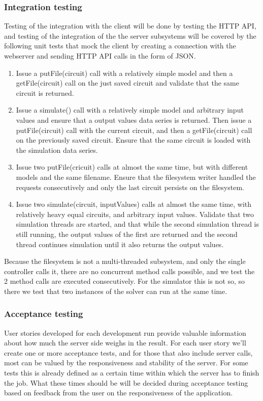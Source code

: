 \subsubsection{Integration testing}
Testing of the integration with the client will be done by testing the HTTP API, and testing of the integration of the the server subsystems will be covered by the following unit tests that mock the client by creating a connection with the webserver and sending HTTP API calls in the form of JSON.

\begin{enumerate}
\item Issue a putFile(circuit) call with a relatively simple model and then a getFile(circuit) call on the just saved circuit and validate that the same circuit is returned.
\item Issue a simulate() call with a relatively simple model and arbitrary input values and ensure that a output values data series is returned. Then issue a putFile(circuit) call with the current circuit, and then a getFile(circuit) call on the previously saved circuit. Ensure that the same circuit is loaded with the simulation data series.
\item Issue two putFile(cricuit) calls at almost the same  time, but with different models and the same filename. Ensure that the filesystem writer handled the requests consecutively and only the last circuit
persists on the filesystem.
\item Issue two simulate(circuit, inputValues) calls at almost the same time, with relatively heavy equal circuits, and arbitrary input values. Validate that two simulation threads are started, and that while the second simulation thread is still running, the output values of the first are returned and the second thread continues simulation until it also returns the output values.\end{enumerate}

\noindent Because the filesystem is not a multi-threaded subsystem, and only the single controller calls it, there are no concurrent method calls possible, and we test the 2 method calls are executed consecutively. For the simulator this is not so, so there we test that two instances of the solver can run at the same time.

\subsubsection{Acceptance testing}
User stories developed for each development run provide valuable information about how much the server side weighs in the result. For each user story we'll create one or more acceptance tests, and for those that also include server calls, most can be valued by the responsiveness and stability of the server. For some tests this is already defined as a certain time within which the server has to finish the job. What these times should be will be decided during acceptance testing based on feedback from the user on the responsiveness of the application.
